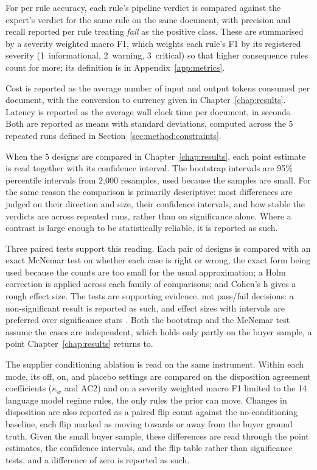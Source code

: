 For per rule accuracy, each rule's pipeline verdict is compared against the expert's verdict for the same rule on the same document, with precision and recall reported per rule treating \emph{fail} as the positive class. These are summarised by a severity weighted macro F1, which weights each rule's F1 by its registered severity (1~informational, 2~warning, 3~critical) so that higher consequence rules count for more; its definition is in Appendix~\ref{app:metrics}.

Cost is reported as the average number of input and output tokens consumed per document, with the conversion to currency given in Chapter~\ref{chap:results}. Latency is reported as the average wall clock time per document, in seconds. Both are reported as means with standard deviations, computed across the 5 repeated runs defined in Section~\ref{sec:method:constraints}.


When the 5 designs are compared in Chapter~\ref{chap:results}, each point estimate is read together with its confidence interval. The bootstrap intervals are 95\% percentile intervals from 2,000 resamples, used because the samples are small. For the same reason the comparison is primarily descriptive: most differences are judged on their direction and size, their confidence intervals, and how stable the verdicts are across repeated runs, rather than on significance alone. Where a contrast is large enough to be statistically reliable, it is reported as such.

Three paired tests support this reading. Each pair of designs is compared with an exact McNemar test \citep{dietterich1998approximate} on whether each case is right or wrong, the exact form being used because the counts are too small for the usual approximation; a Holm correction \citep{holm1979simple} is applied across each family of comparisons; and Cohen's h \citep{cohen1988statistical} gives a rough effect size. The tests are supporting evidence, not pass/fail decisions: a non-significant result is reported as such, and effect sizes with intervals are preferred over significance stars \citep{berrar2017confidence}. Both the bootstrap and the McNemar test assume the cases are independent, which holds only partly on the buyer sample, a point Chapter~\ref{chap:results} returns to.

The supplier conditioning ablation is read on the same instrument. Within each mode, its off, on, and placebo settings are compared on the disposition agreement coefficients ($\kappa_w$ and AC2) and on a severity weighted macro F1 limited to the 14 language model regime rules, the only rules the prior can move. Changes in disposition are also reported as a paired flip count against the no-conditioning baseline, each flip marked as moving towards or away from the buyer ground truth. Given the small buyer sample, these differences are read through the point estimates, the confidence intervals, and the flip table rather than significance tests, and a difference of zero is reported as such.


